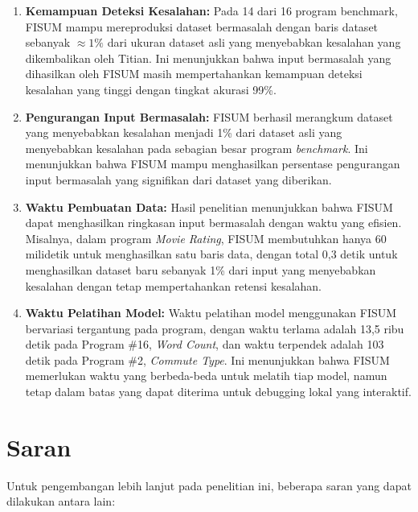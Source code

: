 \begin{enumerate}[nolistsep]

  \item \textbf{Kemampuan Deteksi Kesalahan:} 
  Pada 14 dari 16 program benchmark, 
  FISUM mampu mereproduksi dataset bermasalah
  dengan baris dataset sebanyak $\approx 1\%$ dari ukuran 
  dataset asli yang menyebabkan kesalahan yang
  dikembalikan oleh Titian. Ini menunjukkan bahwa input 
  bermasalah yang dihasilkan oleh FISUM masih 
  mempertahankan kemampuan deteksi kesalahan yang tinggi
  dengan tingkat akurasi 99\%.
  \item \textbf{Pengurangan Input Bermasalah:} 
  FISUM berhasil merangkum dataset yang menyebabkan 
  kesalahan menjadi 1\% dari dataset asli yang menyebabkan 
  kesalahan pada sebagian besar program \emph{benchmark}. 
  Ini menunjukkan bahwa FISUM mampu menghasilkan persentase 
  pengurangan input bermasalah yang signifikan dari 
  dataset yang diberikan.
  \item \textbf{Waktu Pembuatan Data:} 
  Hasil penelitian menunjukkan bahwa FISUM dapat 
  menghasilkan ringkasan input bermasalah dengan 
  waktu yang efisien. Misalnya, dalam program 
  \emph{Movie Rating}, FISUM membutuhkan hanya 
  60 milidetik untuk menghasilkan satu baris data, 
  dengan total 0,3 detik untuk menghasilkan dataset baru
  sebanyak 1\% dari input yang menyebabkan kesalahan
  dengan tetap mempertahankan retensi kesalahan.
  \item \textbf{Waktu Pelatihan Model:} 
  Waktu pelatihan model menggunakan FISUM bervariasi 
  tergantung pada program, dengan waktu terlama 
  adalah 13,5 ribu detik pada Program \#16, 
  \emph{Word Count}, dan waktu terpendek adalah 
  103 detik pada Program \#2, \emph{Commute Type}. 
  Ini menunjukkan bahwa FISUM memerlukan waktu yang 
  berbeda-beda untuk melatih tiap model, namun tetap 
  dalam batas yang dapat diterima untuk debugging 
  lokal yang interaktif.

\end{enumerate}


\section{Saran}
\label{chap:saran}

Untuk pengembangan lebih lanjut pada penelitian ini,
beberapa saran yang dapat dilakukan antara lain:

